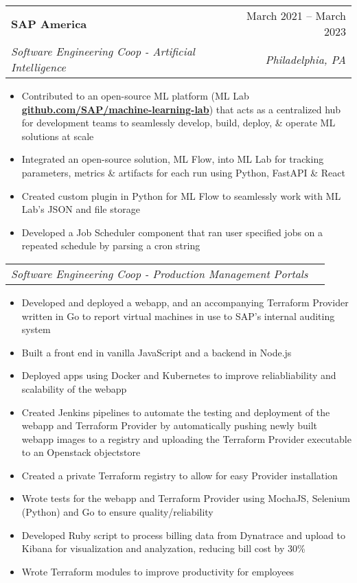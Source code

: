 \documentclass[letterpaper,11pt]{article}
\makeatletter
\newcommand{\resumeItem}[1]{
  \item\small{
    {#1 \vspace{-2pt}}
  }
}
\newcommand{\resumeSubheading}[4]{
  \vspace{-2pt}\item
    \begin{tabular*}{0.97\textwidth}[t]{l@{\extracolsep{\fill}}r}
      \textbf{#1} & #2 \\
      \textit{\small#3} & \textit{\small #4} \\
    \end{tabular*}\vspace{-7pt}
}
\newcommand{\resumeSubSubheading}[2]{
    \item
    \begin{tabular*}{0.97\textwidth}{l@{\extracolsep{\fill}}r}
      \textit{\small#1} & \textit{\small #2} \\
    \end{tabular*}\vspace{-7pt}
}
\newcommand{\resumeItemListStart}{\begin{itemize}}
\newcommand{\resumeItemListEnd}{\end{itemize}\vspace{-5pt}}
\makeatother
\begin{document}
      
    \resumeSubheading
    {SAP America}{March 2021 -- March 2023}
    {Software Engineering Coop - Artificial Intelligence}{Philadelphia, PA}
    \resumeItemListStart
      \resumeItem {Contributed to an open-source ML platform (ML Lab \textbf{\href{https://github.com/SAP/machine-learning-lab}{github.com/SAP/machine-learning-lab}}) that acts as a centralized hub for development teams to seamlessly develop, build, deploy, \& operate ML solutions at scale}
      \resumeItem {Integrated an open-source solution, ML Flow, into ML Lab for tracking parameters, metrics \& artifacts for each run using Python, FastAPI \& React}
      \resumeItem {Created custom plugin in Python for ML Flow to seamlessly work with ML Lab's JSON and file storage}
      \resumeItem {Developed a Job Scheduler component that ran user specified jobs on a repeated schedule by parsing a cron string}
    \resumeItemListEnd
    
    \resumeSubSubheading
    {Software Engineering Coop - Production Management Portals}{}
    \resumeItemListStart
      \resumeItem {Developed and deployed a webapp, and an accompanying Terraform Provider written in Go to report virtual machines in use to SAP's internal auditing system}
      \resumeItem {Built a front end in vanilla JavaScript and a backend in Node.js}
      \resumeItem {Deployed apps using Docker and Kubernetes to improve reliabliability and scalability of the webapp}
      \resumeItem {Created Jenkins pipelines to automate the testing and deployment of the webapp and Terraform Provider by automatically pushing newly built webapp images to a registry and uploading the Terraform Provider executable to an Openstack objectstore}
      \resumeItem {Created a private Terraform registry to allow for easy Provider installation}
      \resumeItem {Wrote tests for the webapp and Terraform Provider using MochaJS, Selenium (Python) and Go to ensure quality/reliability}
      \resumeItem {Developed Ruby script to process billing data from Dynatrace and upload to Kibana for visualization and analyzation, reducing bill cost by 30\%}
      \resumeItem {Wrote Terraform modules to improve productivity for employees}
    \resumeItemListEnd
    
\end{document}
